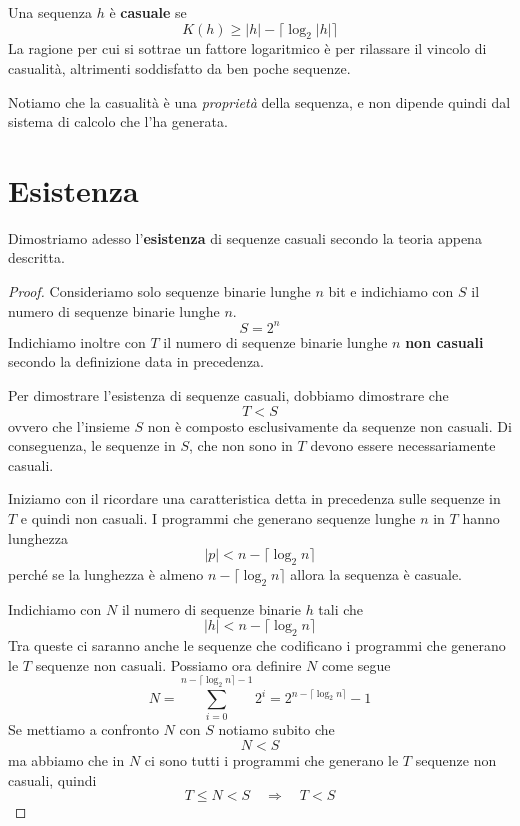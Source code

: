 \begin{definition}
	Una sequenza $h$ \`e \textbf{casuale} se
	\[ K(h) \geq |h| - \lceil \log_2 |h| \rceil \]
	La ragione per cui si sottrae un fattore logaritmico \`e per rilassare il vincolo di casualit\`a, altrimenti
	soddisfatto da ben poche sequenze.
\end{definition}

Notiamo che la casualit\`a \`e una \emph{propriet\`a} della sequenza, e non dipende quindi dal sistema di calcolo
che l'ha generata.

\section{Esistenza}\label{esistenza_casualita}
Dimostriamo adesso l'\textbf{esistenza} di sequenze casuali secondo la teoria appena descritta.

\begin{proof}
	Consideriamo solo sequenze binarie lunghe $n$ bit e indichiamo con $S$ il numero di sequenze binarie lunghe $n$.
	\[ S = 2^n \]
	Indichiamo inoltre con $T$ il numero di sequenze binarie lunghe $n$ \textbf{non casuali} secondo la definizione data
	in precedenza.

	Per dimostrare l'esistenza di sequenze casuali, dobbiamo dimostrare che
	\[ T < S\]
	ovvero che l'insieme $S$ non \`e composto esclusivamente da sequenze non casuali. Di conseguenza, le sequenze in
	$S$, che non sono in $T$ devono essere necessariamente casuali.

	Iniziamo con il ricordare una caratteristica detta in precedenza sulle sequenze in $T$ e quindi non casuali. I
	programmi che generano sequenze lunghe $n$ in $T$ hanno lunghezza
	\[ |p| < n - \lceil \log_2 n \rceil \]
	perch\'e se la lunghezza \`e almeno $n - \lceil \log_2 n \rceil$ allora la sequenza \`e casuale.

	Indichiamo con $N$ il numero di sequenze binarie $h$ tali che
	\[ |h| < n - \lceil \log_2 n \rceil \]
	Tra queste ci saranno anche le sequenze che codificano i programmi che generano le $T$ sequenze non casuali. Possiamo
	ora definire $N$ come segue
	\[ N = \sum_{i=0}^{n - \lceil \log_2 n \rceil - 1} 2^i = 2^{n - \lceil \log_2 n \rceil} - 1 \]
	Se mettiamo a confronto $N$ con $S$ notiamo subito che
	\[ N < S \]
	ma abbiamo che in $N$ ci sono tutti i programmi che generano le $T$ sequenze non casuali, quindi
	\[ T \leq N < S \quad \Rightarrow \quad T < S \]
\end{proof}

